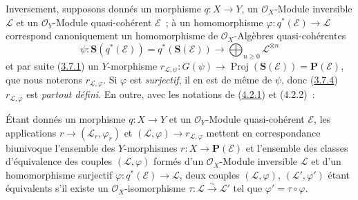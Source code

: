 \begin{env}[4.2.2]
\label{II.4.2.2-fr}
Inversement, supposons donnés un morphisme $q:X\to Y$, un
$\mathcal{O}_X$-Module inversible $\mathcal{L}$ et un
$\mathcal{O}_Y$-Module quasi-cohérent $\mathcal{E}$~; à un homomorphisme
$\varphi:q^*(\mathcal{E})\to\mathcal{L}$ correspond canoniquement un
homomorphisme de $\mathcal{O}_X$-Algèbres quasi-cohérentes
\[
  \psi:\mathbf{S}(q^*(\mathcal{E}))=q^*(\mathbf{S}(\mathcal{E}))
  \longrightarrow\bigoplus_{n\geq0}\mathcal{L}^{\otimes n}
\]
et par suite (\hyperref[II.3.7.1-fr]{3.7.1}) un $Y$-morphisme
$r_{\mathcal{L},\psi}:G(\psi)\to
\operatorname{Proj}(\mathbf{S}(\mathcal{E}))=\mathbf{P}(\mathcal{E})$, que
nous noterons $r_{\mathcal{L},\varphi}$. Si $\varphi$ est \emph{surjectif}, il en est
de même de $\psi$, donc (\hyperref[II.3.7.4-fr]{3.7.4})
$r_{\mathcal{L},\varphi}$ est \emph{partout défini}. En outre, avec les notations de
(\hyperref[II.4.2.1-fr]{4.2.1}) et (4.2.2)~:
\end{env}

\begin{proposition}[4.2.3]
\label{II.4.2.3-fr}
Étant donnés un morphisme $q:X\to Y$ et un $\mathcal{O}_Y$-Module
quasi-cohérent $\mathcal{E}$, les applications
$r\to(\mathcal{L}_r,\varphi_r)$ et
$(\mathcal{L},\varphi)\to r_{\mathcal{L},\varphi}$ mettent en
correspondance biunivoque l'ensemble des $Y$-morphismes
$r:X\to\mathbf{P}(\mathcal{E})$ et l'ensemble des classes d'équivalence des
couples $(\mathcal{L},\varphi)$ formés d'un $\mathcal{O}_X$-Module inversible
$\mathcal{L}$ et d'un homomorphisme surjectif
$\varphi:q^*(\mathcal{E})\to\mathcal{L}$, deux couples
$(\mathcal{L},\varphi)$, $(\mathcal{L}',\varphi')$ étant équivalents s'il
existe un $\mathcal{O}_X$-isomorphisme
$\tau:\mathcal{L}\xrightarrow{\sim}\mathcal{L}'$ tel que
$\varphi'=\tau\circ\varphi$.
\end{proposition}

